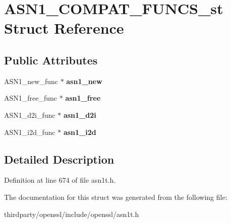 \hypertarget{struct_a_s_n1___c_o_m_p_a_t___f_u_n_c_s__st}{}\section{A\+S\+N1\+\_\+\+C\+O\+M\+P\+A\+T\+\_\+\+F\+U\+N\+C\+S\+\_\+st Struct Reference}
\label{struct_a_s_n1___c_o_m_p_a_t___f_u_n_c_s__st}
\subsection*{Public Attributes}
\begin{DoxyCompactItemize}
\item 
\mbox{\label{struct_a_s_n1___c_o_m_p_a_t___f_u_n_c_s__st_a94f635811e78f33d0fe04c596dbfc11e}} 
A\+S\+N1\+\_\+new\+\_\+func $\ast$ {\bfseries asn1\+\_\+new}
\item 
\mbox{\label{struct_a_s_n1___c_o_m_p_a_t___f_u_n_c_s__st_adc6f726c319ead22c5b6c3aee130b8df}} 
A\+S\+N1\+\_\+free\+\_\+func $\ast$ {\bfseries asn1\+\_\+free}
\item 
\mbox{\label{struct_a_s_n1___c_o_m_p_a_t___f_u_n_c_s__st_aeddb5865fc5b6642fc062d737a032b2b}} 
A\+S\+N1\+\_\+d2i\+\_\+func $\ast$ {\bfseries asn1\+\_\+d2i}
\item 
\mbox{\label{struct_a_s_n1___c_o_m_p_a_t___f_u_n_c_s__st_a0cc66997a2839cd692302f0cc1ffbb56}} 
A\+S\+N1\+\_\+i2d\+\_\+func $\ast$ {\bfseries asn1\+\_\+i2d}
\end{DoxyCompactItemize}


\subsection{Detailed Description}


Definition at line 674 of file asn1t.\+h.



The documentation for this struct was generated from the following file\+:\begin{DoxyCompactItemize}
\item 
thirdparty/openssl/include/openssl/asn1t.\+h\end{DoxyCompactItemize}
